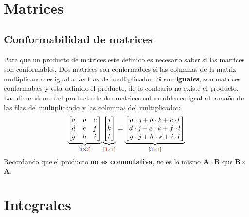 \documentclass[
	12pt, %
	fleqn, %
	a4paper, %
	oneside, %
]{LegrandOrangeBook}
\begin{document}
\chapter{Matrices}
\section{Conformabilidad de matrices}
Para que un producto de matrices este definido es necesario saber si las matrices son conformables. Dos matrices son conformables si las columnas de la matriz multiplicando es igual a las filas del multiplicador. Si son \textbf{iguales}, son matrices conformables y esta definido el producto, de lo contrario no existe el producto. Las dimensiones del producto de dos matrices coformables es igual al tamaño de las filas del multiplicando y las columnas del multiplicador:
\begin{equation}\label{art:matricesconformables}
   \underbrace{\begin{bmatrix}
     a & b & c\\
     d & e & f\\
     g & h & i
   \end{bmatrix}}_{[\textcolor{blue}{3}\times \textcolor{red}{3}]}
   \underbrace{\begin{bmatrix}j \\k\\l \end{bmatrix}}_{[\textcolor{red}{3}\times \textcolor{orange}{1}]}
   =\underbrace{\begin{bmatrix}a\cdot j+b\cdot k +c\cdot l\\d\cdot j+e\cdot k +f\cdot l\\g\cdot j+h\cdot k +i\cdot l
\end{bmatrix}}_{[\textcolor{blue}{3}\times \textcolor{orange}{1}]}
\end{equation}
Recordando que el producto \textbf{no es conmutativa}, no es lo mismo \textbf{A}$\times$\textbf{B} que \textbf{B}$\times$\textbf{A}.
\chapter{Integrales}
\end{document}
